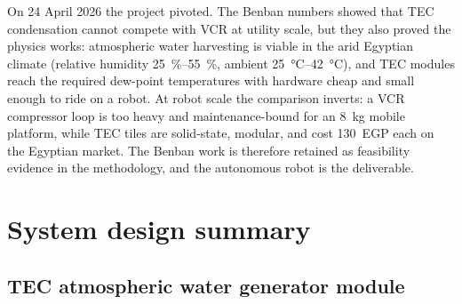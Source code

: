 \documentclass[11pt,a4paper]{article}
\begin{document}
On 24 April 2026 the project pivoted. The Benban numbers showed that TEC
condensation cannot compete with VCR at utility scale, but they also
proved the physics works: atmospheric water harvesting is viable in the
arid Egyptian climate (relative humidity \SIrange{25}{55}{\percent},
ambient \SIrange{25}{42}{\degreeCelsius}), and TEC modules reach the
required dew-point temperatures with hardware cheap and small enough to
ride on a robot. At robot scale the comparison inverts: a VCR compressor
loop is too heavy and maintenance-bound for an \SI{8}{\kilogram} mobile
platform, while TEC tiles are solid-state, modular, and cost
\num{130}~EGP each on the Egyptian market. The Benban work is therefore
retained as feasibility evidence in the methodology, and the autonomous
robot is the deliverable.

\section{System design summary}
\label{sec:design}

\subsection{TEC atmospheric water generator module}
\end{document}

